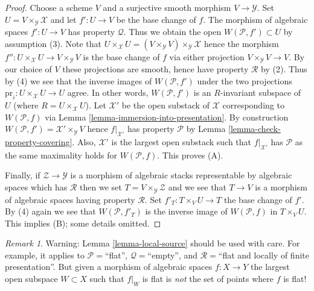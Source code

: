 \documentclass{stacks-project}
\theoremstyle{plain}
\theoremstyle{definition}
\theoremstyle{remark}
\newtheorem{remark}[subsection]{Remark}
\numberwithin{equation}{subsection}
\begin{document}
\begin{proof}
Choose a scheme $V$ and a surjective smooth morphism $V \to \mathcal{Y}$.
Set $U = V \times_\mathcal{Y} \mathcal{X}$ and let $f' : U \to V$ be the
base change of $f$. The morphism of algebraic spaces $f' : U \to V$ has
property $\mathcal{Q}$. Thus we obtain the open $W(\mathcal{P}, f') \subset U$
by assumption (3). Note that
$U \times_\mathcal{X} U =
(V \times_\mathcal{Y} V) \times_\mathcal{Y} \mathcal{X}$
hence the morphism $f'' : U \times_\mathcal{X} U \to V \times_\mathcal{Y} V$
is the base change of $f$ via either projection
$V \times_\mathcal{Y} V \to V$. By our choice of $V$ these projections
are smooth, hence have property $\mathcal{R}$ by (2). Thus by (4) we see
that the inverse images of $W(\mathcal{P}, f')$ under the two projections
$\text{pr}_i : U \times_\mathcal{X} U \to U$ agree. In other words,
$W(\mathcal{P}, f')$ is an $R$-invariant subspace of $U$ (where
$R = U \times_\mathcal{X} U$). Let $\mathcal{X}'$ be the open substack of
$\mathcal{X}$ corresponding to $W(\mathcal{P}, f)$ via
Lemma \ref{lemma-immersion-into-presentation}.
By construction $W(\mathcal{P}, f') = \mathcal{X}' \times_\mathcal{Y} V$
hence $f|_{\mathcal{X}'}$ has property $\mathcal{P}$ by
Lemma \ref{lemma-check-property-covering}.
Also, $\mathcal{X}'$ is the largest open substack
such that $f|_{\mathcal{X}'}$ has $\mathcal{P}$ as the same maximality holds
for $W(\mathcal{P}, f)$. This proves (A).

\medskip\noindent
Finally, if $\mathcal{Z} \to \mathcal{Y}$ is a
morphism of algebraic stacks representable by algebraic spaces which has
$\mathcal{R}$ then we set $T = V \times_\mathcal{Y} \mathcal{Z}$ and
we see that $T \to V$ is a morphism of algebraic spaces having
property $\mathcal{R}$. Set $f'_T : T \times_V U \to T$ the base change
of $f'$. By (4) again we see that $W(\mathcal{P}, f'_T)$ is the
inverse image of $W(\mathcal{P}, f)$ in $T \times_V U$. This implies
(B); some details omitted.
\end{proof}

\begin{remark}
\label{remark-local-source-warning}
Warning:
Lemma \ref{lemma-local-source}
should be used with care. For example, it applies to
$\mathcal{P}=$``flat'', $\mathcal{Q}=$``empty'',
and $\mathcal{R}=$``flat and locally of finite presentation''. But given a
morphism of algebraic spaces $f : X \to Y$ the largest open
subspace $W \subset X$ such that $f|_W$ is flat is {\it not} the set of points
where $f$ is flat!
\end{remark}
\end{document}

